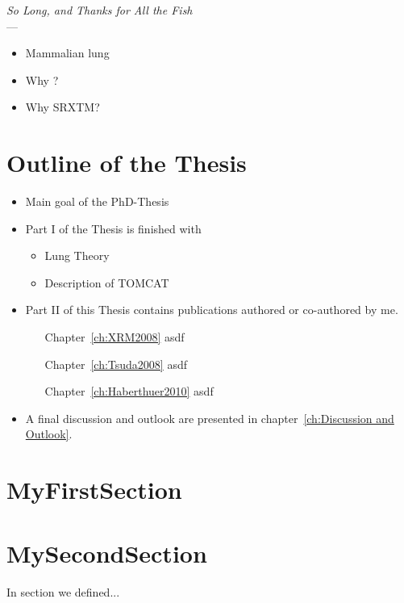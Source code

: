 \label{ch:Introduction}
\begin{flushright}{\slshape    
		So Long, and Thanks for All the Fish} \\ \medskip
    ---  \citep{Adams1984}
\end{flushright}
\begin{itemize}
	\item Mammalian lung
	\item Why \threed ?
	\item Why \ac{SRXTM}?
\end{itemize}

\section{Outline of the Thesis}
\begin{itemize}
	\item Main goal of the PhD-Thesis
	\item Part I of the Thesis is finished with 
	\begin{itemize}
		\item Lung Theory
		\item Description of TOMCAT
	\end{itemize}
	\item Part II of this Thesis contains publications authored or co-authored by me.
	\begin{itemize}
		\item [Chapter~\ref{ch:XRM2008}] asdf
		\item [Chapter~\ref{ch:Tsuda2008}] asdf
		\item [Chapter~\ref{ch:Haberthuer2010}] asdf
	\end{itemize}

	\item A final discussion and outlook are presented in chapter~\ref{ch:Discussion and Outlook}.
\end{itemize}


\section{MyFirstSection} \label{marker}
\section{MySecondSection}
In section  we defined...

